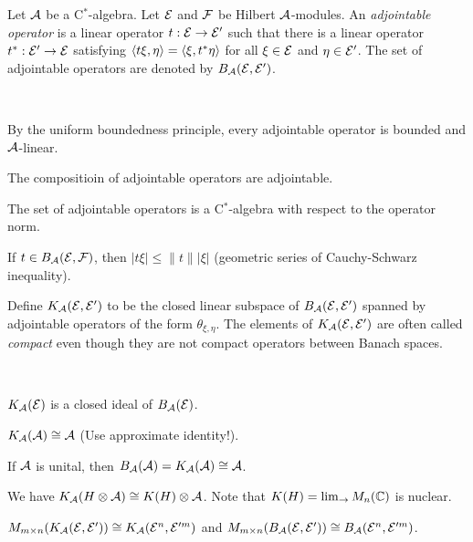 \documentclass{../../../small}
\begin{document}
\begin{defn}
Let $\mathcal{A}$ be a C$^*$-algebra.
Let $\mathcal{E}$ and $\mathcal{F}$ be Hilbert $\mathcal{A}$-modules.
An \emph{adjointable operator} is a linear operator $t:\mathcal{E}\to\mathcal{E}'$ such that there is a linear operator $t^*:\mathcal{E}'\to\mathcal{E}$ satisfying $\langle t\xi,\eta\rangle=\langle\xi,t^*\eta\rangle$ for all $\xi\in\mathcal{E}$ and $\eta\in\mathcal{E}'$.
The set of adjointable operators are denoted by $B_{\mathcal{A}}(\mathcal{E},\mathcal{E}')$.
\end{defn}

\begin{prop}\,
\begin{parts}
\item By the uniform boundedness principle, every adjointable operator is bounded and $\mathcal{A}$-linear.
\item The compositioin of adjointable operators are adjointable.
\item The set of adjointable operators is a C$^*$-algebra with respect to the operator norm.
\item If $t\in B_{\mathcal{A}}(\mathcal{E},\mathcal{F})$, then $|t\xi|\le\|t\||\xi|$ (geometric series of Cauchy-Schwarz inequality).
\end{parts}
\end{prop}

\begin{defn}
Define $K_{\mathcal{A}}(\mathcal{E},\mathcal{E}')$ to be the closed linear subspace of $B_{\mathcal{A}}(\mathcal{E},\mathcal{E}')$ spanned by adjointable operators of the form $\theta_{\xi,\eta}$.
The elements of $K_{\mathcal{A}}(\mathcal{E},\mathcal{E}')$ are often called \emph{compact} even though they are not compact operators between Banach spaces.
\end{defn}

\begin{prop}\,
\begin{parts}
\item $K_{\mathcal{A}}(\mathcal{E})$ is a closed ideal of $B_{\mathcal{A}}(\mathcal{E})$.
\item $K_{\mathcal{A}}(\mathcal{A})\cong\mathcal{A}$ (Use approximate identity!).
\item If $\mathcal{A}$ is unital, then $B_{\mathcal{A}}(\mathcal{A})=K_{\mathcal{A}}(\mathcal{A})\cong\mathcal{A}$.
\item We have $K_{\mathcal{A}}(H\otimes\mathcal{A})\cong K(H)\otimes\mathcal{A}$. Note that $K(H)=\lim_\to M_n(\mathbb{C})$ is nuclear.
\item $M_{m\times n}(K_{\mathcal{A}}(\mathcal{E},\mathcal{E}'))\cong K_{\mathcal{A}}(\mathcal{E}^n,\mathcal{E}'^m)$ and $M_{m\times n}(B_{\mathcal{A}}(\mathcal{E},\mathcal{E}'))\cong B_{\mathcal{A}}(\mathcal{E}^n,\mathcal{E}'^m)$.
\end{parts}
\end{prop}
\end{document}
